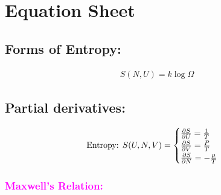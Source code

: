 

\section{Equation Sheet}

\subsection*{Forms of Entropy:}

\begin{align}
	S(N, U) = k \log \Omega
\end{align}

\subsection*{Partial derivatives:}

\begin{align}
	\text{Entropy: } S(U, N, V) =
	\begin{cases}
		\pdv{S}{U} = \frac{1}{T}    \\
		\pdv{S}{V} = \frac{P}{T}    \\
		\pdv{S}{N} = -\frac{\mu}{T} \\
	\end{cases}
\end{align}

\subsubsection*{\textcolor{magenta}{Maxwell's Relation:}}

